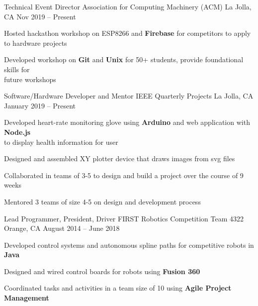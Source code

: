 \documentclass[]{awesome-cv}
\begin{document}
\vspace{-5mm}
\begin{cventries}
	\cventry
  {Technical Event Director}
  {Association for Computing Machinery (ACM)}
	{La Jolla, CA}
  {Nov 2019 – Present}
	{\begin{cvitems}
    \item {Hosted hackathon workshop on ESP8266 and \textbf{Firebase} for
      competitors to apply to hardware projects}
    \item {Developed workshop on \textbf{Git} and \textbf{Unix} for 50+
      students, provide foundational skills for \\ future workshops}
		\end{cvitems}}

	\vspace{-3mm}
	\cventry
  {Software/Hardware Developer and  Mentor}
	{IEEE Quarterly Projects}
	{La Jolla, CA}
  {January 2019 – Present}
	{\begin{cvitems}
    \item {Developed heart-rate monitoring glove using \textbf{Arduino} and
      web application with \textbf{Node.js}\\ to display health information for
      user}
    \item {Designed and assembled XY plotter device that draws images from svg
      files}
    \item {Collaborated in teams of 3-5 to design and build a project over the
      course of 9 weeks}
    \item {Mentored 3 teams of size 4-5 on design and development process}
		\end{cvitems}}

	\vspace{-3mm}
	\cventry
	{Lead Programmer, President, Driver}
	{FIRST Robotics Competition Team 4322}
	{Orange, CA}
	{August 2014 – June 2018}
	{\begin{cvitems}
		\item {Developed control systems and autonomous spline paths for competitive robots in
      \textbf{Java}}
    \item {Designed and wired control boards for robots using
      \textbf{Fusion 360}}
    \item {Coordinated tasks and activities in a team size of 10 using \textbf{Agile
      Project Management}}
		\end{cvitems}}


\end{cventries}
\end{document}
